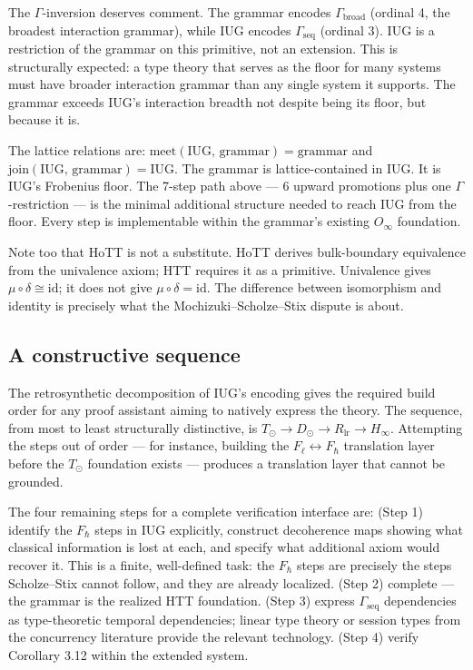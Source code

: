 \documentclass[12pt]{article}
\theoremstyle{plain}
\theoremstyle{definition}
\theoremstyle{remark}
\begin{document}
The $\Gamma$-inversion deserves comment. The grammar encodes $\Gamma_\text{broad}$
(ordinal 4, the broadest interaction grammar), while IUG encodes $\Gamma_\text{seq}$
(ordinal 3). IUG is a restriction of the grammar on this primitive, not an extension.
This is structurally expected: a type theory that serves as the floor for many systems
must have broader interaction grammar than any single system it supports. The grammar
exceeds IUG's interaction breadth not despite being its floor, but because it is.

The lattice relations are:
$\text{meet}(\text{IUG},\,\text{grammar}) = \text{grammar}$
and $\text{join}(\text{IUG},\,\text{grammar}) = \text{IUG}$.
The grammar is lattice-contained in IUG. It is IUG's Frobenius floor. The 7-step path
above --- 6 upward promotions plus one $\Gamma$-restriction --- is the minimal additional
structure needed to reach IUG from the floor. Every step is implementable within the
grammar's existing $O_\infty$ foundation.

Note too that HoTT is not a substitute. HoTT derives bulk-boundary equivalence from the
univalence axiom; HTT requires it as a primitive. Univalence gives $\mu \circ \delta \cong \text{id}$;
it does not give $\mu \circ \delta = \text{id}$. The difference between isomorphism and
identity is precisely what the Mochizuki--Scholze--Stix dispute is about.

\subsection{A constructive sequence}
\label{subsec:constructive}

The retrosynthetic decomposition of IUG's encoding gives the required build order for any
proof assistant aiming to natively express the theory. The sequence, from most to least
structurally distinctive, is $T_\odot \to D_\odot \to R_\text{lr} \to H_\infty$.
Attempting the steps out of order --- for instance, building the $F_\ell \leftrightarrow F_\hbar$
translation layer before the $T_\odot$ foundation exists --- produces a translation layer
that cannot be grounded.

The four remaining steps for a complete verification interface are: (Step 1) identify the
$F_\hbar$ steps in IUG explicitly, construct decoherence maps showing what classical
information is lost at each, and specify what additional axiom would recover it. This is a
finite, well-defined task: the $F_\hbar$ steps are precisely the steps Scholze--Stix cannot
follow, and they are already localized. (Step 2) complete --- the grammar is the realized
HTT foundation. (Step 3) express $\Gamma_\text{seq}$ dependencies as type-theoretic temporal
dependencies; linear type theory or session types from the concurrency literature provide
the relevant technology. (Step 4) verify Corollary 3.12 within the extended system.
\end{document}
